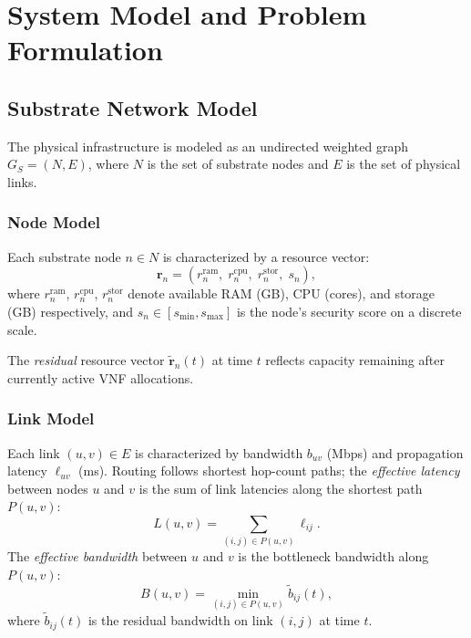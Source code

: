 \chapter{System Model and Problem Formulation}

\section{Substrate Network Model}

The physical infrastructure is modeled as an undirected weighted graph $G_S = (N, E)$, where $N$ is the set of substrate nodes and $E$ is the set of physical links.

\subsection{Node Model}

Each substrate node $n \in N$ is characterized by a resource vector:
\begin{equation}
\mathbf{r}_n = \left(r_n^{\text{ram}},\; r_n^{\text{cpu}},\; r_n^{\text{stor}},\; s_n\right),
\end{equation}
where $r_n^{\text{ram}}$, $r_n^{\text{cpu}}$, $r_n^{\text{stor}}$ denote available RAM (GB), CPU (cores), and storage (GB) respectively, and $s_n \in [s_{\min}, s_{\max}]$ is the node's security score on a discrete scale.

The \textit{residual} resource vector $\tilde{\mathbf{r}}_n(t)$ at time $t$ reflects capacity remaining after currently active VNF allocations.

\subsection{Link Model}

Each link $(u,v) \in E$ is characterized by bandwidth $b_{uv}$ (Mbps) and propagation latency $\ell_{uv}$ (ms). Routing follows shortest hop-count paths; the \textit{effective latency} between nodes $u$ and $v$ is the sum of link latencies along the shortest path $P(u,v)$:
\begin{equation}
L(u,v) = \sum_{(i,j) \in P(u,v)} \ell_{ij}.
\end{equation}
The \textit{effective bandwidth} between $u$ and $v$ is the bottleneck bandwidth along $P(u,v)$:
\begin{equation}
B(u,v) = \min_{(i,j) \in P(u,v)} \tilde{b}_{ij}(t),
\end{equation}
where $\tilde{b}_{ij}(t)$ is the residual bandwidth on link $(i,j)$ at time $t$.

